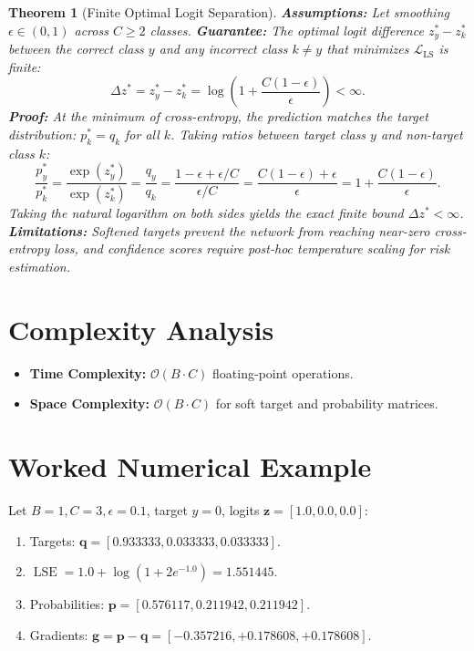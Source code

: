 \documentclass[11pt]{article}
\newtheorem{theorem}{Theorem}
\begin{document}
\begin{theorem}[Finite Optimal Logit Separation]
\label{thm:finite_logit_gap}
\textbf{Assumptions:} Let smoothing $\epsilon \in (0, 1)$ across $C \ge 2$ classes.
\textbf{Guarantee:} The optimal logit difference $z_y^* - z_k^*$ between the correct class $y$ and any incorrect class $k \neq y$ that minimizes $\mathcal{L}_{\mathrm{LS}}$ is finite:
\begin{equation}
\Delta z^* = z_y^* - z_k^* = \log\left( 1 + \frac{C(1 - \epsilon)}{\epsilon} \right) < \infty.
\end{equation}
\textbf{Proof:}
At the minimum of cross-entropy, the prediction matches the target distribution: $p_k^* = q_k$ for all $k$.
Taking ratios between target class $y$ and non-target class $k$:
\begin{equation}
\frac{p_y^*}{p_k^*} = \frac{\exp(z_y^*)}{\exp(z_k^*)} = \frac{q_y}{q_k} = \frac{1 - \epsilon + \epsilon / C}{\epsilon / C} = \frac{C(1 - \epsilon) + \epsilon}{\epsilon} = 1 + \frac{C(1 - \epsilon)}{\epsilon}.
\end{equation}
Taking the natural logarithm on both sides yields the exact finite bound $\Delta z^* < \infty$.
\textbf{Limitations:} Softened targets prevent the network from reaching near-zero cross-entropy loss, and confidence scores require post-hoc temperature scaling for risk estimation.
\end{theorem}

\section{Complexity Analysis}
\label{sec:complexity}

\begin{itemize}
    \item \textbf{Time Complexity:} $\mathcal{O}(B \cdot C)$ floating-point operations.
    \item \textbf{Space Complexity:} $\mathcal{O}(B \cdot C)$ for soft target and probability matrices.
\end{itemize}

\section{Worked Numerical Example}
\label{sec:worked_example}

Let $B = 1, C = 3, \epsilon = 0.1$, target $y = 0$, logits $\mathbf{z} = [1.0, 0.0, 0.0]$:
\begin{enumerate}
    \item Targets: $\mathbf{q} = [0.933333, 0.033333, 0.033333]$.
    \item $\operatorname{LSE} = 1.0 + \log(1 + 2e^{-1.0}) = 1.551445$.
    \item Probabilities: $\mathbf{p} = [0.576117, 0.211942, 0.211942]$.
    \item Gradients: $\mathbf{g} = \mathbf{p} - \mathbf{q} = [-0.357216, +0.178608, +0.178608]$.
\end{enumerate}
\end{document}
